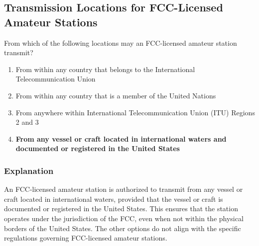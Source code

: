 \subsection{Transmission Locations for FCC-Licensed Amateur Stations}
\label{T1C06}

\begin{tcolorbox}[colback=gray!10!white,colframe=black!75!black,title=T1C06]
From which of the following locations may an FCC-licensed amateur station transmit?
\begin{enumerate}[label=\Alph*),noitemsep]
    \item From within any country that belongs to the International Telecommunication Union
    \item From within any country that is a member of the United Nations
    \item From anywhere within International Telecommunication Union (ITU) Regions 2 and 3
    \item \textbf{From any vessel or craft located in international waters and documented or registered in the United States}
\end{enumerate}
\end{tcolorbox}

\subsubsection*{Explanation}
An FCC-licensed amateur station is authorized to transmit from any vessel or craft located in international waters, provided that the vessel or craft is documented or registered in the United States. This ensures that the station operates under the jurisdiction of the FCC, even when not within the physical borders of the United States. The other options do not align with the specific regulations governing FCC-licensed amateur stations.